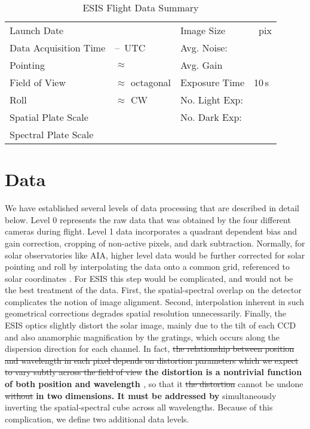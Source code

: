 		\begin{table}
		\begin{center}
			\caption{ESIS Flight Data Summary}
			\label{tab:data_info}
			\begin{tabular}{ll|ll}\hline
				Launch Date & \dateMission & Image Size  & \imageShape~pix\\
				Data Acquisition Time & \timeDataStart--\timeDataStop~UTC & Avg. Noise: & \readoutNoise\\ 
			    Pointing   &  $\approx$ \esispointing & Avg. Gain &   \gain \\
				Field of View  & $\approx$ \esisfov octagonal  & Exposure Time & 10\,s \\
				Roll & $\approx$ \esisroll CW & No. Light Exp: &\numDataFrames\\
			    Spatial  Plate Scale  &  \plateScale & No. Dark Exp: &\numDarkFrames \\
				Spectral  Plate Scale  &  \dispersion & \\
					\hline
			\end{tabular}
		
		\end{center}
		\end{table}
		
		



	
\section{Data} 

We have established several levels of data processing that are described in detail below.
Level 0 represents the raw data that was obtained by the four different cameras during flight.
Level 1 data incorporates %
a quadrant dependent bias and gain correction, cropping of non-active pixels, and dark subtraction.
Normally, for solar observatories like AIA, higher level data would be further corrected for solar pointing and roll by interpolating the data onto a common grid, referenced to solar coordinates \citep{Lemen2012}.
For ESIS this step would be complicated, and would not be the best treatment of the data.  
First, the spatial-spectral overlap on the detector complicates the notion of image alignment. Second, interpolation inherent in such geometrical corrections degrades spatial resolution unnecessarily.  
Finally, the ESIS optics slightly distort the solar image, mainly due to the tilt of each CCD and also anamorphic magnification by the gratings, which occurs along the dispersion direction for each channel. 
In fact, \sout{the relationship between position and wavelength in each pixel depends on distortion parameters which we expect to vary subtly across the field of view} \textbf{the distortion is a nontrivial function of both position and wavelength \citep{Smart2019}}, so that it \sout{the distortion} cannot be undone \sout{without} \textbf{in two dimensions. It must be addressed by} simultaneously inverting the spatial-spectral cube across all wavelengths.
Because of this complication, we define two additional data levels.  

